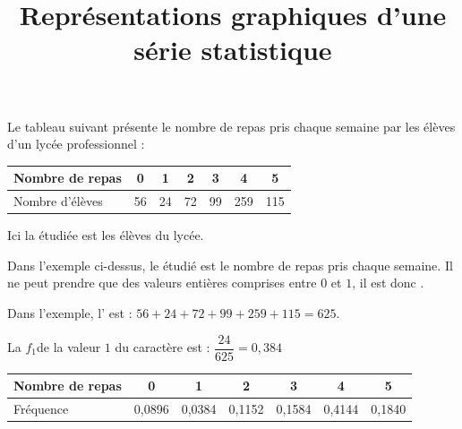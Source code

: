 \documentclass[12pt,a4paper]{article}
\date{}
\title{Représentations graphiques d'une série statistique }
\begin{document}


\begin{myex}
	
	Le tableau suivant présente le nombre de repas pris chaque semaine par les élèves d'un lycée professionnel :
	
	\begin{center}
		\begin{tabular}{|@{\ }l@{\ }|@{\ }c@{\ }|@{\ }c@{\ }|@{\ }c@{\ }|@{\ }c@{\ }|@{\ }c@{\ }|@{\ }c@{\ }|}
			\hline
			Nombre de repas & 0 & 1 & 2 & 3 & 4 & 5 \\ \hline
			Nombre d'élèves & 56 & 24 & 72 & 99 & 259 & 115 \\ \hline
		\end{tabular}
	\end{center}
	
	Ici la  étudiée est les élèves du lycée.
\end{myex}

\begin{myex}
	
	Dans l'exemple ci-dessus, le  étudié est le nombre de repas pris chaque semaine. Il ne peut prendre que des valeurs entières comprises entre $0$ et $1$, il est donc .
	
	
\end{myex}


	\begin{myex}
		Dans l'exemple, l' est : $56 + 24 + 72 + 99 + 259 + 115 = 625$.	
	\end{myex}
			

	\begin{myex}
		La  $f_1$de la valeur $1$ du caractère est : $\dfrac{24}{625} = 0,384$ 
		
		\begin{center}
			
			
			\begin{tabular}{|@{\ }l@{\ }|@{\ }c@{\ }|@{\ }c@{\ }|@{\ }c@{\ }|@{\ }c@{\ }|@{\ }c@{\ }|@{\ }c@{\ }|}
				\hline
				Nombre de repas & 0 & 1 & 2 & 3 & 4 & 5 \\ \hline
				Fréquence & 0,0896 & 0,0384 & 0,1152 & 0,1584 & 0,4144 & 0,1840 \\ \hline
			\end{tabular}
		\end{center}
	\end{myex}
	
\end{document}
